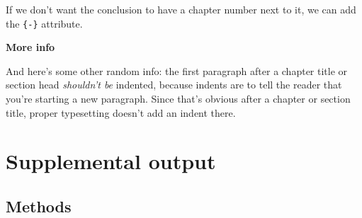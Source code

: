 \documentclass[12pt, twoside]{amherstthesis}
\begin{document}
If we don't want the conclusion to have a chapter number next to it, we can add the \texttt{\{-\}} attribute.

\textbf{More info}

And here's some other random info: the first paragraph after a chapter title or section head \emph{shouldn't be} indented, because indents are to tell the reader that you're starting a new paragraph. Since that's obvious after a chapter or section title, proper typesetting doesn't add an indent there.

\appendix

\hypertarget{supplemental-output}{%
\chapter{Supplemental output}\label{supplemental-output}}

\hypertarget{suppmethods}{%
\section{Methods}\label{suppmethods}}
\end{document}
